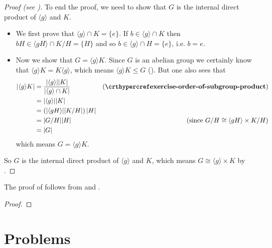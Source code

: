 \begin{proof}[Proof (see {\cite[Lemma 13.9]{judson_beezer_2022}})]
    To end the proof, we need to show that $G$ is the internal direct product of $\langle g\rangle$ and $K$.
    \begin{itemize}
        \item We first prove that $\langle g\rangle \cap K = \{e\}$. If $b \in \langle g\rangle \cap K$ then $bH \in \langle gH\rangle \cap K/H = \{H\}$ and so $b \in \langle g \rangle \cap H = \{e\}$, i.e. $b = e$.
        
        \item Now we show that $G = \langle g\rangle K$. Since $G$ is an abelian group we certainly know that $\langle g\rangle K = K\langle g\rangle$, which means $\langle g\rangle K \leq G$ (). But one also sees that
        \begin{align*}
            |\langle g\rangle K| &= \frac{|\langle g\rangle||K|}{|\langle g\rangle \cap K|} & (\myref{exercise-order-of-subgroup-product})\\
            &= |\langle g\rangle||K|\\
            &= \left(|\langle gH \rangle||K/H|\right)|H|\\
            &= |G/H||H| & (\text{since }G/H \cong \langle gH \rangle \times K/H)\\
            &= |G|
        \end{align*}
        which means $G = \langle g\rangle K$.
    \end{itemize}
    So $G$ is the internal direct product of $\langle g\rangle$ and $K$, which means $G \cong \langle g\rangle \times K$ by .
\end{proof}

The proof of  follows from  and .
\begin{proof}
\end{proof}

\newpage

\section{Problems}
